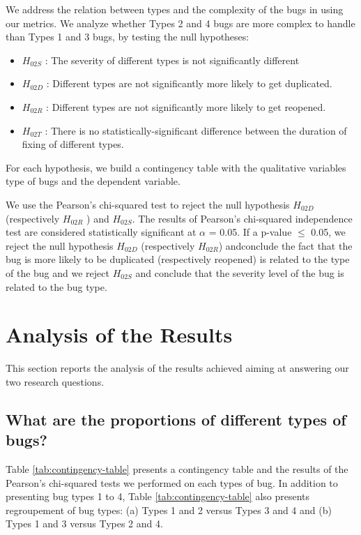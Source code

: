 We address the relation between types and the complexity of the bugs in using our metrics.
We analyze whether Types 2 and 4 bugs are more complex to handle than Types 1 and 3 bugs, by testing the null hypotheses:

\begin{itemize}
 \item  $H_{02S}$ : The severity of different types is not significantly different
 \item  $H_{02D}$ : Different types are not significantly more likely to get duplicated.
 \item  $H_{02R}$ : Different types are not significantly more likely to get reopened.
 \item $H_{02T}$ : There is no statistically-significant difference
between the duration of fixing of different types.
\end{itemize}

For each hypothesis, we build a contingency table with the qualitative variables type of bugs and the dependent variable.

We use the Pearson's chi-squared test to reject the null
hypothesis $H_{02D}$ (respectively $H_{02R}$ ) and $H_{02S}$. The results of Pearson's chi-squared independence test are considered
statistically significant at $\alpha$ = 0.05.
If a p-value $\le$ 0.05, we reject the null hypothesis $H_{02D}$ (respectively $H_{02R}$) andconclude the fact that the bug is more likely to be duplicated (respectively reopened) is related to the type of the bug and we reject $H_{02S}$ and conclude that the severity level of the bug is related to the bug type.

\section{Analysis of the Results}



This section reports the analysis of the results achieved
aiming at answering our two research questions.

\subsection{What are the proportions of different types of bugs?}



Table \ref{tab:contingency-table} presents a contingency table and the results of the Pearson's chi-squared tests we performed on each types of bug.
In addition to presenting bug types 1 to 4,  Table \ref{tab:contingency-table} also presents regroupement of bug types:
(a) Types 1 and 2 versus Types 3 and 4 and (b) Types 1 and 3 versus Types 2 and 4.


